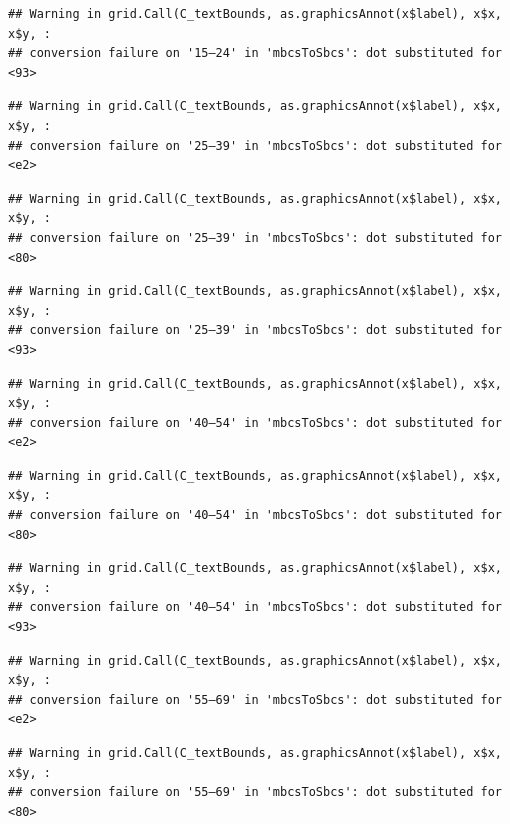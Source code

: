 \documentclass[
]{article}
\begin{document}
\begin{verbatim}
## Warning in grid.Call(C_textBounds, as.graphicsAnnot(x$label), x$x, x$y, :
## conversion failure on '15–24' in 'mbcsToSbcs': dot substituted for <93>
\end{verbatim}

\begin{verbatim}
## Warning in grid.Call(C_textBounds, as.graphicsAnnot(x$label), x$x, x$y, :
## conversion failure on '25–39' in 'mbcsToSbcs': dot substituted for <e2>
\end{verbatim}

\begin{verbatim}
## Warning in grid.Call(C_textBounds, as.graphicsAnnot(x$label), x$x, x$y, :
## conversion failure on '25–39' in 'mbcsToSbcs': dot substituted for <80>
\end{verbatim}

\begin{verbatim}
## Warning in grid.Call(C_textBounds, as.graphicsAnnot(x$label), x$x, x$y, :
## conversion failure on '25–39' in 'mbcsToSbcs': dot substituted for <93>
\end{verbatim}

\begin{verbatim}
## Warning in grid.Call(C_textBounds, as.graphicsAnnot(x$label), x$x, x$y, :
## conversion failure on '40–54' in 'mbcsToSbcs': dot substituted for <e2>
\end{verbatim}

\begin{verbatim}
## Warning in grid.Call(C_textBounds, as.graphicsAnnot(x$label), x$x, x$y, :
## conversion failure on '40–54' in 'mbcsToSbcs': dot substituted for <80>
\end{verbatim}

\begin{verbatim}
## Warning in grid.Call(C_textBounds, as.graphicsAnnot(x$label), x$x, x$y, :
## conversion failure on '40–54' in 'mbcsToSbcs': dot substituted for <93>
\end{verbatim}

\begin{verbatim}
## Warning in grid.Call(C_textBounds, as.graphicsAnnot(x$label), x$x, x$y, :
## conversion failure on '55–69' in 'mbcsToSbcs': dot substituted for <e2>
\end{verbatim}

\begin{verbatim}
## Warning in grid.Call(C_textBounds, as.graphicsAnnot(x$label), x$x, x$y, :
## conversion failure on '55–69' in 'mbcsToSbcs': dot substituted for <80>
\end{verbatim}
\end{document}
